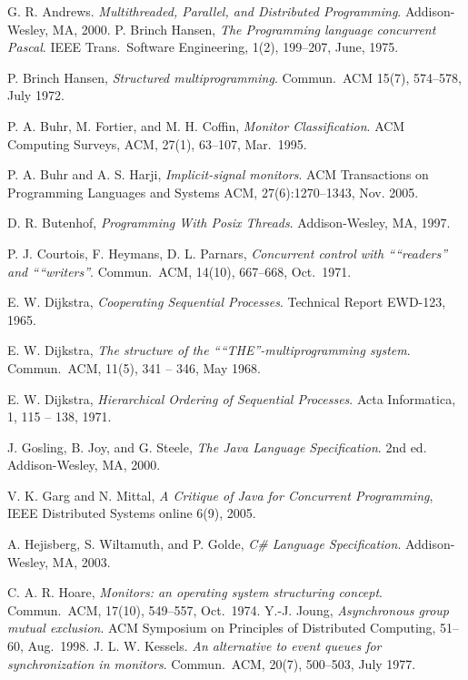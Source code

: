 \documentclass{sigplanconf}
\begin{document}
\begin{thebibliography}{}
\softraggedright

    G. R. Andrews. \emph{Multithreaded, Parallel, and Distributed Programming}.
    Addison-Wesley, MA, 2000.  
  P. Brinch Hansen, \emph{The Programming language concurrent Pascal}. IEEE
  Trans.~Software Engineering, 1(2), 199--207, June, 1975.

    P. Brinch Hansen, \emph{Structured multiprogramming}. Commun.~ACM 15(7),
    574--578, July 1972.

  P. A. Buhr, M. Fortier, and M. H. Coffin, \emph{Monitor Classification}. ACM 
  Computing Surveys, ACM, 27(1), 63--107, 
  Mar.~1995.
  
  P. A. Buhr and A. S. Harji, \emph{Implicit-signal monitors}. ACM 
  Transactions on Programming Languages and Systems ACM, 27(6):1270--1343, 
  Nov. 2005.

  D. R. Butenhof, \emph{Programming With Posix Threads}.
  Addison-Wesley, MA, 1997.

    P. J. Courtois, F. Heymans, D. L. Parnars, \emph{Concurrent control with
    “``readers'' and “``writers''}. Commun.~ACM, 14(10), 667--668, Oct.~1971.

    E. W. Dijkstra, \emph{Cooperating Sequential Processes}.  Technical Report
    EWD-123, 1965. 
    
    E. W. Dijkstra, \emph{The structure of the “``THE''-multiprogramming
    system}. Commun.~ACM, 11(5), 341 -- 346, May 1968. 

    E. W. Dijkstra, \emph{Hierarchical Ordering of Sequential Processes}. Acta
    Informatica, 1, 115 -- 138, 1971.

    J. Gosling, B. Joy, and G. Steele, \emph{The Java Language Specification}.
    2nd ed. Addison-Wesley, MA, 2000. 

    V. K. Garg and N. Mittal, \emph{A Critique of Java for Concurrent
    Programming}, IEEE Distributed Systems online 6(9), 2005.

    A. Hejisberg, S. Wiltamuth, and P. Golde, \emph{C\# Language
    Specification}. Addison-Wesley, MA, 2003.

  C. A. R. Hoare, \emph{Monitors: an operating system structuring concept}. 
  Commun.~ACM, 17(10), 549--557, Oct.~1974. 
 Y.-J. Joung, \emph{Asynchronous group mutual exclusion}. ACM Symposium on 
    Principles of Distributed Computing, 51--60, Aug.~1998. 
    J. L. W. Kessels. \emph{An alternative to event queues for synchronization 
    in monitors}. Commun.~ACM, 20(7), 500--503, July 1977.
  

\end{thebibliography}
\end{document}

